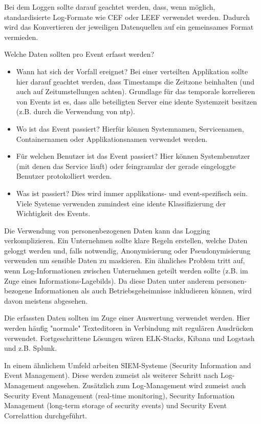 Bei dem Loggen sollte darauf geachtet werden, dass, wenn möglich, standardisierte Log-Formate wie CEF oder LEEF verwendet werden. Dadurch wird das Konvertieren der jeweiligen Datenquellen auf ein gemeinsames Format vermieden.

Welche Daten sollten pro Event erfasst werden?

\begin{itemize}
	\item Wann hat sich der Vorfall ereignet? Bei einer verteilten Applikation sollte hier darauf geachtet werden, dass Timestamps die Zeitzone beinhalten (und auch auf Zeitumstellungen achten). Grundlage für das temporale korrelieren von Events ist es, dass alle beteiligten Server eine idente Systemzeit besitzen (z.B. durch die Verwendung von ntp).
	\item Wo ist das Event passiert? Hierfür können Systemnamen, Servicenamen, Containernamen oder Applikationsnamen verwendet werden.
	\item Für welchen Benutzer ist das Event passiert? Hier können Systembenutzer (mit denen das Service läuft) oder feingranular der gerade eingeloggte Benutzer protokolliert werden.
	\item Was ist passiert? Dies wird immer applikations- und event-spezifisch sein. Viele Systeme verwenden zumindest eine idente Klassifizierung der Wichtigkeit des Events.
\end{itemize}

Die Verwendung von personenbezogenen Daten kann das Logging verkomplizieren. Ein Unternehmen sollte klare Regeln erstellen, welche Daten geloggt werden und, falls notwendig, Anonymisierung oder Pseudonymisierung verwenden um sensible Daten zu maskieren. Ein ähnliches Problem tritt auf, wenn Log-Informationen zwischen Unternehmen geteilt werden sollte (z.B. im Zuge eines Informations-Lagebilds). Da diese Daten unter anderem personen-bezogene Informationen als auch Betriebsgeheimnisse inkludieren können, wird davon meistens abgesehen.

Die erfassten Daten sollten im Zuge einer Auswertung verwendet werden. Hier werden häufig "normale" Texteditoren in Verbindung mit regulären Ausdrücken verwendet. Fortgeschrittene Lösungen wären ELK-Stacks, Kibana und Logstash und z.B. Splunk.

In einem ähnlichem Umfeld arbeiten SIEM-Systeme (Security Information and Event Management). Diese werden zumeist als weiterer Schritt nach Log-Management angesehen. Zusätzlich zum Log-Management wird zumeist auch Security Event Management (real-time monitoring), Security Information Management (long-term storage of security events) und Security Event Correlattion durchgeführt.

